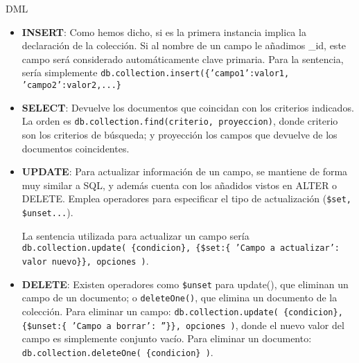 \bigskip

\pagebreak
\bigskip
{\LARGE DML}

  \begin{itemize}
    \item \textbf{INSERT}: Como hemos dicho, si es la primera instancia implica la declaración de la colección. Si al nombre de un campo le añadimos \_id, este campo será considerado automáticamente clave primaria. Para la sentencia, sería simplemente \texttt{db.collection.insert(\{'campo1':valor1, 'campo2':valor2,...\}}

    \item \textbf{SELECT}: Devuelve los documentos que coincidan con los criterios indicados. La orden es \texttt{db.collection.find(criterio, proyeccion)}, donde criterio son los criterios de búsqueda; y proyección los campos que devuelve de los documentos coincidentes.

    \item \textbf{UPDATE}: Para actualizar información de un campo, se mantiene de forma muy similar a SQL, y además cuenta con los añadidos vistos en ALTER o DELETE. Emplea operadores para especificar el tipo de actualización (\texttt{\$set, \$unset...}).

    La sentencia utilizada para actualizar un campo sería \texttt{db.collection.update( \{condicion\}, \{\$set:\{ 'Campo a actualizar': valor nuevo\}\}, opciones )}.

    \item \textbf{DELETE}: Existen operadores como \texttt{\$unset} para update(), que eliminan un campo de un documento; o \texttt{deleteOne()}, que elimina un documento de la colección.
    Para eliminar un campo: \texttt{db.collection.update( \{condicion\}, \{\$unset:\{ 'Campo a borrar': ''\}\}, opciones )}, donde el nuevo valor del campo es simplemente conjunto vacío.
    Para eliminar un documento: \texttt{db.collection.deleteOne( \{condicion\} )}.


  \end{itemize}
